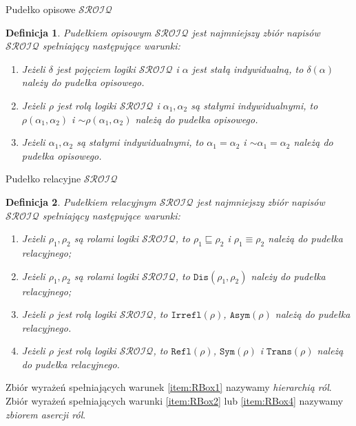 \documentclass{beamer}
\newtheorem{definicja}{Definicja}
\begin{document}
\begin{frame}[shrink=0.9]{Pudełko opisowe $\mathcal{SROIQ}$}
%
\begin{definicja}
\label{ABoxSROIQ}
Pudełkiem opisowym $\mathcal{SROIQ}$ jest najmniejszy zbiór napisów $\mathcal{SROIQ}$ spełniający następujące warunki:
%
\begin{enumerate}
\item \label{item:ABox1} Jeżeli $\delta$ jest pojęciem logiki $\mathcal{SROIQ}$ i $\alpha$ jest stałą indywidualną, to $\delta(\alpha)$ należy do pudełka opisowego.
%
\item \label{item:ABox2}  Jeżeli $\rho$ jest rolą logiki $\mathcal{SROIQ}$ i $\alpha_{1}, \alpha_{2}$ są stałymi indywidualnymi, to $\rho(\alpha_{1}, \alpha_{2})$ i $\sim \rho(\alpha_{1}, \alpha_{2})$ należą do pudełka opisowego.
%
\item \label{item:ABox3}  Jeżeli $\alpha_{1}, \alpha_{2}$ są stałymi indywidualnymi, to $\alpha_{1} = \alpha_{2}$ i $\sim \alpha_{1} = \alpha_{2}$ należą do pudełka opisowego.
\end{enumerate}
\end{definicja}
\end{frame}

\begin{frame}[shrink=0.9]{Pudełko relacyjne $\mathcal{SROIQ}$}
%
\begin{definicja}
\label{RBoxSROIQ}
Pudełkiem relacyjnym $\mathcal{SROIQ}$ jest najmniejszy zbiór napisów $\mathcal{SROIQ}$ spełniający następujące warunki:
%
\begin{enumerate}
\item \label{item:RBox1} Jeżeli $\rho_{1}, \rho_{2}$ są rolami logiki $\mathcal{SROIQ}$, to $\rho_{1} \sqsubseteq \rho_{2}$ i $\rho_{1} \equiv \rho_{2}$ należą do pudełka relacyjnego;
%
\item \label{item:RBox2} Jeżeli $\rho_{1}, \rho_{2}$ są rolami logiki $\mathcal{SROIQ}$, to $\texttt{Dis}(\rho_{1}, \rho_{2})$ należy do pudełka relacyjnego;
%
\item \label{item:RBox3} Jeżeli $\rho$ jest rolą logiki $\mathcal{SROIQ}$, to $\texttt{Irrefl}(\rho)$, $\texttt{Asym}(\rho)$ należą do pudełka relacyjnego.
%
\item \label{item:RBox4} Jeżeli $\rho$ jest rolą logiki $\mathcal{SROIQ}$, to $\texttt{Refl}(\rho)$, $\texttt{Sym}(\rho)$ i $\texttt{Trans}(\rho)$ należą do pudełka relacyjnego.
\end{enumerate}
\end{definicja}
%
Zbiór wyrażeń spełniających warunek \ref{item:RBox1} nazywamy \emph{hierarchią ról}.\\
%
Zbiór wyrażeń spełniających warunki \ref{item:RBox2} lub \ref{item:RBox4} nazywamy \emph{zbiorem asercji ról}.\\
\end{frame}
\end{document}

